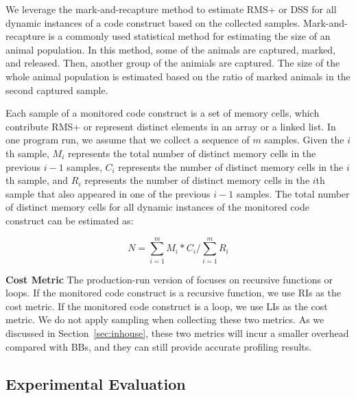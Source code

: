 We leverage the mark-and-recapture method\citep{mark-recapture} to 
estimate RMS+ or DSS for all dynamic instances of a code construct 
based on the collected samples. 
Mark-and-recapture is a commonly used statistical method 
for estimating the size of an animal population. 
In this method, some of the animals are captured, marked, and released. 
Then, another group of the animials are captured.
The size of the whole animal population is estimated 
based on the ratio of marked animals in the second captured sample.  


Each sample of a monitored code construct is a set of memory cells, 
which contribute RMS+ or represent distinct elements in an array or a linked list. 
In one program run, we assume that we collect a sequence of $m$ samples. 
Given the $i$th sample, $M_i$ represents the 
total number of distinct memory cells in the previous $i-1$ samples, 
$C_i$ represents the number of distinct memory cells in the $i$th sample,
and $R_i$ represents the number of distinct memory cells in 
the $i$th sample that also appeared in one of the previous $i-1$ samples.
The total number of distinct memory cells for all dynamic instances 
of the monitored code construct can be estimated as:



\begin{equation} \label{eq:mark}
N = \sum\limits_{i=1}^m M_i*C_i\Big/\sum\limits_{i=1}^m R_i
\end{equation}

\noindent\textbf{Cost Metric}
The production-run version of \Tool focuses on recursive functions or loops.
If the monitored code construct is a recursive function,
we use RIs as the cost metric.
If the monitored code construct is a loop, 
we use LIs as the cost metric. 
We do not apply sampling when collecting these two metrics. 
As we discussed in Section~\ref{sec:inhouse},
these two metrics will incur a smaller overhead compared with BBs, 
and they can still provide accurate profiling results.  


\subsection{Experimental Evaluation}

